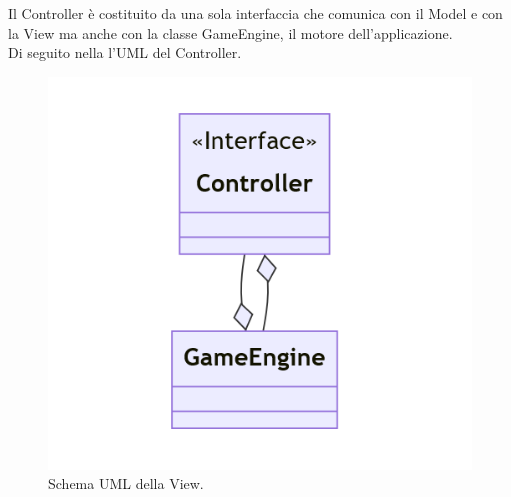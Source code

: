 \documentclass[a4paper,12pt]{report}
\begin{document}
Il Controller è costituito da una sola interfaccia che comunica con il Model e con la View ma anche con la classe GameEngine, il motore dell'applicazione.
\\Di seguito nella  l'UML del Controller.
\begin{figure}[H]
    \centering{}
    \includegraphics[scale=0.4]{images/Controller.png}
    \caption{Schema UML della View.}
    \label{images:Controller}
\end{figure}
\end{document}
